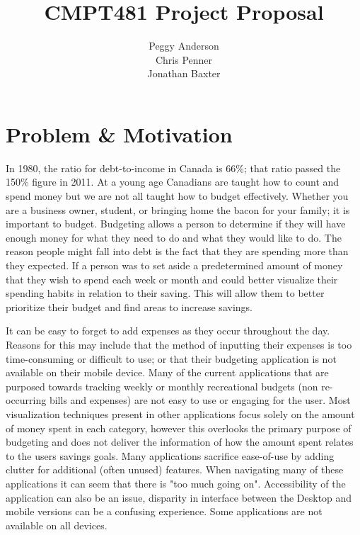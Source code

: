 \documentclass{chi2011}
\begin{document}
\setlength{\paperheight}{11in}
\setlength{\paperwidth}{8.5in}
\setlength{\pdfpageheight}{\paperheight}
\setlength{\pdfpagewidth}{\paperwidth}


\title{CMPT481 Project Proposal}
\author{
\alignauthor Peggy Anderson\\
    \alignauthor Chris Penner\\
    \alignauthor Jonathan Baxter\\
}


\maketitle

\section{Problem \& Motivation}

In 1980, the ratio for debt-to-income in Canada is 66\%; that ratio passed the 150\% figure in 2011. At a young age
Canadians are taught how to count and spend money but we are not all taught how to budget effectively. Whether you are
a business owner, student, or bringing home the bacon for your family; it is important to budget. Budgeting allows a
person to determine if they will have enough money for what they need to do and what they would like to do. The reason
people might fall into debt is the fact that they are spending more than they expected. If a person was to set aside a
predetermined amount of money that they wish to spend each week or month and could better visualize their spending
habits in relation to their saving. This will allow them to better prioritize their budget and find areas to increase
savings.

It can be easy to forget to add expenses as they occur throughout the day. Reasons for this may include that the method
of inputting their expenses is too time-consuming or difficult to use; or that their budgeting application is not
available on their mobile device. Many of the current applications that are purposed towards tracking weekly or monthly
recreational budgets (non re-occurring bills and expenses) are not easy to use or engaging for the user.  Most
visualization techniques present in other applications focus solely on the amount of money spent in each category,
however this overlooks the primary purpose of budgeting and does not deliver the information of how the amount spent
relates to the users savings goals. Many applications sacrifice ease-of-use by adding clutter for additional (often
unused) features. When navigating many of these applications it can seem that there is "too much going on".
Accessibility of the application can also be an issue, disparity in interface between the Desktop and mobile versions
can be a confusing experience. Some applications are not available on all devices.
\end{document}
